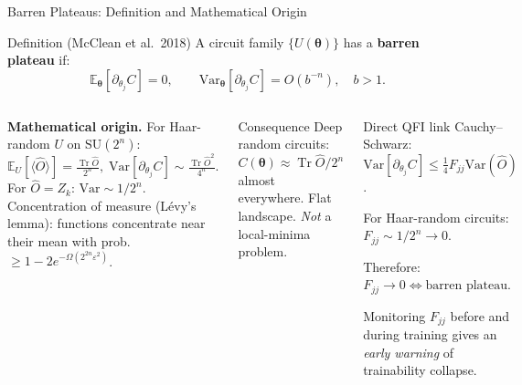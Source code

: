 \documentclass[aspectratio=169,10pt]{beamer}
\newcommand{\btheta}{\boldsymbol{\theta}}
\newcommand{\E}{\mathbb{E}}
\newcommand{\Variance}{\mathrm{Var}}
\newcommand{\Tr}{\operatorname{Tr}}
\begin{document}
\begin{frame}{Barren Plateaus: Definition and Mathematical Origin}
\small
  \begin{block}{Definition (McClean et al.\ 2018)}
    A circuit family $\{U(\btheta)\}$ has a
    \textbf{barren plateau} if:
    \[
      \E_{\btheta}\!\left[\partial_{\theta_j}C\right] = 0,
      \qquad
      \Variance_{\btheta}\!\left[\partial_{\theta_j}C\right]
      = O(b^{-n}),\quad b>1.
    \]
  \end{block}

  \begin{columns}[T]
    \textbf{Mathematical origin.}
    For Haar-random $U$ on $\mathrm{SU}(2^n)$:
    \[
      \E_U[\langle\hat{O}\rangle]
      = \tfrac{\Tr\hat{O}}{2^n},\;
      \Variance[\partial_{\theta_j}C]
      \sim \tfrac{\Tr\hat{O}^2}{4^n}.
    \]
    For $\hat{O}=Z_k$: $\Variance\sim 1/2^n$.
    Concentration of measure (Lévy's lemma):
    functions concentrate near their mean with prob.\
    $\geq 1-2e^{-\Omega(2^{2n}\varepsilon^2)}$.
    \begin{alertblock}{Consequence}
      Deep random circuits:
      $C(\btheta)\approx\Tr\hat{O}/2^n$ almost everywhere.
      Flat landscape. \emph{Not} a local-minima problem.
    \end{alertblock}
    \begin{block}{Direct QFI link}
      Cauchy--Schwarz:
      $\Variance[\partial_{\theta_j}C]
        \leq \tfrac{1}{4}F_{jj}\Variance(\hat{O})$.

      For Haar-random circuits:
      $F_{jj}\sim 1/2^n\to 0$.

      Therefore:
      $F_{jj}\to 0 \Longleftrightarrow \text{barren plateau.}$

      Monitoring $F_{jj}$ before and during training
      gives an \emph{early warning} of trainability collapse.
    \end{block}
  \end{columns}
\end{frame}
\end{document}
